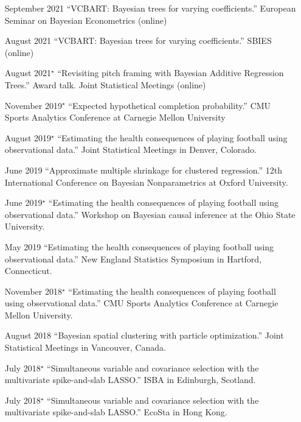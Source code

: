 \documentclass[margin]{res}
\begin{document}
\begin{resume}
{\begin{itemize}
\item[September 2021]{``VCBART: Bayesian trees for varying coefficients.'' European Seminar on Bayesian Econometrics (online)}

\item[August 2021]{``VCBART: Bayesian trees for varying coefficients.'' SBIES (online)}

\item[August 2021$^{\star}$]{``Revisiting pitch framing with Bayesian Additive Regression Trees.'' Award talk. Joint Statistical Meetings (online)}

\item[November 2019$^{\star}$]{``Expected hypothetical completion probability.'' CMU Sports Analytics Conference at Carnegie Mellon University}

\item[August 2019$^{\star}$]{``Estimating the health consequences of playing football using observational data.'' Joint Statistical Meetings in Denver, Colorado.}

\item[June 2019]{``Approximate multiple shrinkage for clustered regression.'' 12th International Conference on Bayesian Nonparametrics at Oxford University.}

\item[June 2019$^{\star}$]{``Estimating the health consequences of playing football using observational data.'' Workshop on Bayesian causal inference at the Ohio State University.}

\item[May 2019]{``Estimating the health consequences of playing football using observational data.'' New England Statistics Symposium in Hartford, Connecticut.}

\item[November 2018$^{\star}$]{``Estimating the health consequences of playing football using observational data.'' CMU Sports Analytics Conference at Carnegie Mellon University.}

\item[August 2018]{``Bayesian spatial clustering with particle optimization.'' Joint Statistical Meetings in Vancouver, Canada.}

\item[July 2018$^{\star}$]{``Simultaneous variable and covariance selection with the multivariate spike-and-slab LASSO.'' ISBA in Edinburgh, Scotland.}

\item[July 2018$^{\star}$]{``Simultaneous variable and covariance selection with the multivariate spike-and-slab LASSO.'' EcoSta in Hong Kong.}


\end{itemize}}
\end{resume}
\end{document}
